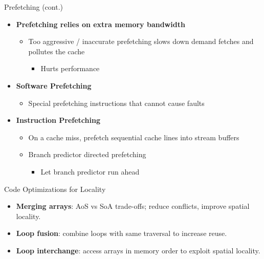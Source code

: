 \documentclass[aspectratio=169,12pt]{beamer}
\begin{document}
\begin{frame}{Prefetching (cont.)}
\begin{itemize}
  \item \textbf{Prefetching relies on extra memory bandwidth}
  \begin{itemize}
    \item Too aggressive / inaccurate prefetching slows down demand fetches and pollutes the cache
    \begin{itemize}
      \item Hurts performance
    \end{itemize}
  \end{itemize}
  
  \item \textbf{Software Prefetching}
  \begin{itemize}
    \item Special prefetching instructions that cannot cause faults
  \end{itemize}
  
  \item \textbf{Instruction Prefetching}
  \begin{itemize}
    \item On a cache miss, prefetch sequential cache lines into stream buffers
    \item Branch predictor directed prefetching
    \begin{itemize}
      \item Let branch predictor run ahead
    \end{itemize}
  \end{itemize}
\end{itemize}
\end{frame}

\begin{frame}{Code Optimizations for Locality}
\begin{itemize}
  \item \textbf{Merging arrays}: AoS vs SoA trade-offs; reduce conflicts, improve spatial locality.
  \item \textbf{Loop fusion}: combine loops with same traversal to increase reuse.
  \item \textbf{Loop interchange}: access arrays in memory order to exploit spatial locality.
\end{itemize}
\end{frame}
\end{document}
